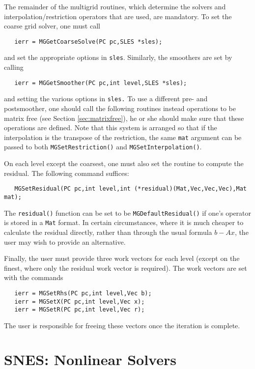 The remainder of the multigrid routines, which determine
the solvers and interpolation/restriction operators that are used,
are mandatory.
To set the coarse grid solver, one must 
call 
\begin{verbatim}
   ierr = MGGetCoarseSolve(PC pc,SLES *sles);
\end{verbatim}
and set the appropriate options in {\tt sles}. Similarly, the 
smoothers are set by calling 
\begin{verbatim}
   ierr = MGGetSmoother(PC pc,int level,SLES *sles);
\end{verbatim}
and setting the various options in {\tt sles.} 
To use a different pre- and postsmoother, one should call the following
routines instead operations to be matrix free
(see Section \ref{sec:matrixfree}),
he or she should make sure that these operations are defined. 
Note that this system is arranged so that if the interpolation is 
the transpose of the restriction, the same {\tt mat} argument can be 
passed to both {\tt MGSetRestriction()} and {\tt MGSetInterpolation()}.

On each level except the coarsest, one must also set the routine to 
compute the residual.  The following command suffices: 
\begin{verbatim}
   MGSetResidual(PC pc,int level,int (*residual)(Mat,Vec,Vec,Vec),Mat mat);
\end{verbatim}
The {\tt residual()} function can be set to be {\tt MGDefaultResidual()}
if 
one's operator is stored in a {\tt Mat} format.  In certain circumstances, 
where it is much cheaper to calculate the residual directly, rather 
than through the usual formula $b - Ax$,  the user may wish to provide 
an alternative. 

Finally, the user must provide three work vectors for each level 
(except on the finest, where only the residual work vector is required).
The work vectors are set with the 
commands    
\begin{verbatim}
   ierr = MGSetRhs(PC pc,int level,Vec b);
   ierr = MGSetX(PC pc,int level,Vec x);
   ierr = MGSetR(PC pc,int level,Vec r);
\end{verbatim}
The user is responsible for freeing these vectors once the iteration 
is complete.

\chapter{SNES: Nonlinear Solvers}
\label{chapter:snes}

